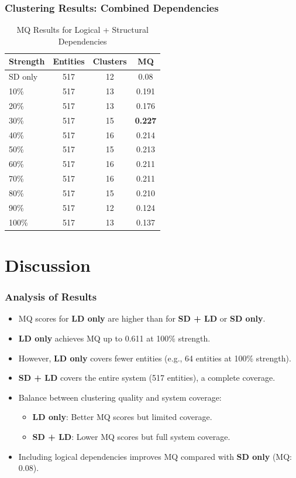 \documentclass{beamer}
\begin{document}
\begin{frame}
\frametitle{Clustering Results: Combined Dependencies}
\begin{center}
    \begin{table}
    \centering
    \caption{MQ Results for Logical + Structural Dependencies}
    \begin{tabular}{lccc}
        \toprule
        \textbf{Strength} & \textbf{Entities} & \textbf{Clusters} & \textbf{MQ} \\
        \midrule
	SD only & 517 & 12 & 0.08 \\
	\hline
        10\% & 517 & 13 & 0.191 \\
        20\% & 517 & 13 & 0.176 \\
        \rowcolor{yellow} 30\% & 517 & 15 & \textbf{0.227} \\
        40\% & 517 & 16 & 0.214 \\
        50\% & 517 & 15 & 0.213 \\
        60\% & 517 & 16 & 0.211 \\
        70\% & 517 & 16 & 0.211 \\
        80\% & 517 & 15 & 0.210 \\
        90\% & 517 & 12 & 0.124 \\
        100\% & 517 & 13 & 0.137 \\
        \bottomrule
    \end{tabular}
    \end{table}
\end{center}
\end{frame}

\section{Discussion}

\begin{frame}
\frametitle{Analysis of Results}
\begin{itemize}
    \item MQ scores for \textbf{LD only} are higher than for \textbf{SD + LD} or \textbf{SD only}.
    \item \textbf{LD only} achieves MQ up to 0.611 at 100\% strength.
    \item However, \textbf{LD only} covers fewer entities (e.g., 64 entities at 100\% strength).
    \item \textbf{SD + LD} covers the entire system (517 entities), a complete coverage.
    \item Balance between clustering quality and system coverage:
    \begin{itemize}
        \item \textbf{LD only}: Better MQ scores but limited coverage.
        \item \textbf{SD + LD}: Lower MQ scores but full system coverage. 
    \end{itemize}
    \item Including logical dependencies improves MQ compared with \textbf{SD only} (MQ: 0.08).
\end{itemize}
\end{frame}
\end{document}
